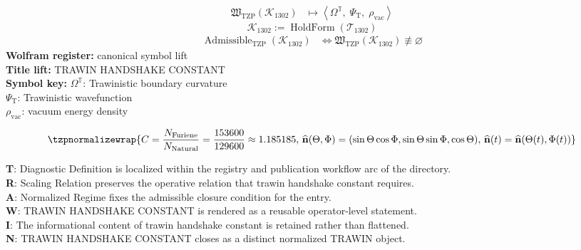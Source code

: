 \noindent
\begin{minipage}[t]{0.48\linewidth}
\begingroup
\small
\[
\begin{aligned}
\mathfrak{W}_{\mathrm{TZP}}\!\left(\mathcal{K}_{1302}\right)
&\longmapsto
\left\langle \Omega^{\mathbb{T}},\; \Psi_{\mathrm{T}},\; \rho_{\mathrm{vac}} \right\rangle
\end{aligned}
\]
\[
\mathcal{K}_{1302}
:=
\operatorname{HoldForm}\!\left(\mathcal{T}_{1302}\right)
\]
\[
\begin{aligned}
\operatorname{Admissible}_{\mathrm{TZP}}\!\left(\mathcal{K}_{1302}\right)
&\Longleftrightarrow
\mathfrak{W}_{\mathrm{TZP}}\!\left(\mathcal{K}_{1302}\right)\not\equiv\varnothing
\end{aligned}
\]
\textbf{Wolfram register:} canonical symbol lift\\
\textbf{Title lift:} TRAWIN HANDSHAKE CONSTANT\\
\textbf{Symbol key:} \(\Omega^{\mathbb{T}}\): Trawinistic boundary curvature\\ \(\Psi_{\mathrm{T}}\): Trawinistic wavefunction\\ \(\rho_{\mathrm{vac}}\): vacuum energy density
\par
\endgroup
\end{minipage}\hfill
\begin{minipage}[t]{0.48\linewidth}
\[
\tzpnormalizewrap{C=\frac{N_{\mathrm{Furiene}}}{N_{\mathrm{Natural}}}=\frac{153600}{129600}\approx1.185185,\,\widehat{\mathbf{n}}(\Theta,\Phi)=(\sin\Theta\cos\Phi,\sin\Theta\sin\Phi,\cos\Theta),\,\widehat{\mathbf{n}}(t)=\widehat{\mathbf{n}}(\Theta(t),\Phi(t))}
\]

\small
\textbf{T}: Diagnostic Definition is localized within the registry and publication workflow arc of the directory.\\
\textbf{R}: Scaling Relation preserves the operative relation that trawin handshake constant requires.\\
\textbf{A}: Normalized Regime fixes the admissible closure condition for the entry.\\
\textbf{W}: TRAWIN HANDSHAKE CONSTANT is rendered as a reusable operator-level statement.\\
\textbf{I}: The informational content of trawin handshake constant is retained rather than flattened.\\
\textbf{N}: TRAWIN HANDSHAKE CONSTANT closes as a distinct normalized TRAWIN object.
\normalsize
\end{minipage}

